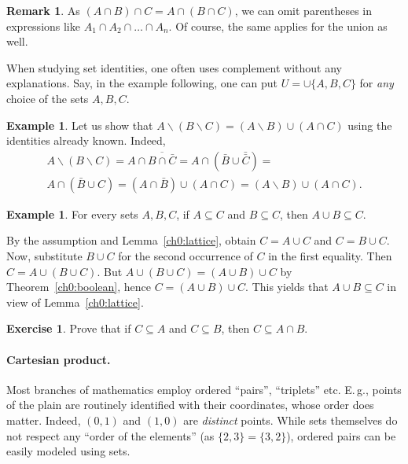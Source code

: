 \documentclass[12pt,notitlepage]{article}
\theoremstyle{plain}
\theoremstyle{definition}
\newtheorem{exc}[thm]{Exercise}
\newtheorem{exm}[thm]{Example}
\newtheorem{rem}[thm]{Remark}
\theoremstyle{plain}
\newcommand{\sbs}{\subseteq}
\renewcommand{\setminus}{\smallsetminus}
\newcommand{\1}{\mathbf{1}}
\newcommand{\0}{\mathbf{0}}
\begin{document}
\begin{rem}
As $(A \cap B) \cap C = A \cap (B \cap C)$, we can omit parentheses in expressions like $A_1 \cap A_2 \cap \ldots \cap A_n$. Of course, the same applies for the union as well.
\end{rem}

When studying set identities, one often uses complement without any explanations. Say, in the example following, one can put $U = \cup\{A, B, C\}$ for \emph{any} choice of the sets $A, B, C$.

\begin{exm}
Let us show that $A \setminus (B \setminus C) = (A \setminus B) \cup (A \cap C)$ using the identities already known. Indeed,
\begin{multline*}
A \setminus (B \setminus C) = A \cap \overline{B \cap \bar C} = A \cap (\bar B \cup \bar{\bar C}) =\\
A \cap (\bar B \cup C) = (A \cap \bar B) \cup (A \cap C) = (A \setminus B) \cup (A \cap C).
\end{multline*}
\end{exm}

\begin{exm}\label{L2:cup_sup}
For every sets $A, B, C$, if $A \sbs C$ and $B \sbs C$, then $A \cup B \sbs C$.

By the assumption and Lemma~\ref{ch0:lattice}, obtain $C = A \cup C$ and $C = B \cup C$. Now, substitute $B \cup C$ for the second occurrence of $C$ in the first equality. Then $C = A \cup (B \cup C)$. But $A \cup (B \cup C) = (A \cup B) \cup C$ by Theorem~\ref{ch0:boolean}, hence $C = (A \cup B) \cup C$. This yields that $A \cup B \sbs C$ in view of Lemma~\ref{ch0:lattice}.
\end{exm}

\begin{exc}
Prove that if $C \sbs A$ and $C \sbs B$, then $C \sbs A \cap B$.
\end{exc}

\paragraph{Cartesian product.} Most branches of mathematics employ ordered ``pairs'', ``triplets'' etc. E.\,g., points of the plain are routinely identified with their coordinates, whose order does matter. Indeed, $(0,1)$ and $(1,0)$ are \emph{distinct} points. While sets themselves do not respect any ``order of the elements'' (as $\{2,3\} = \{3,2\}$), ordered pairs can be easily modeled using sets.
\end{document}
